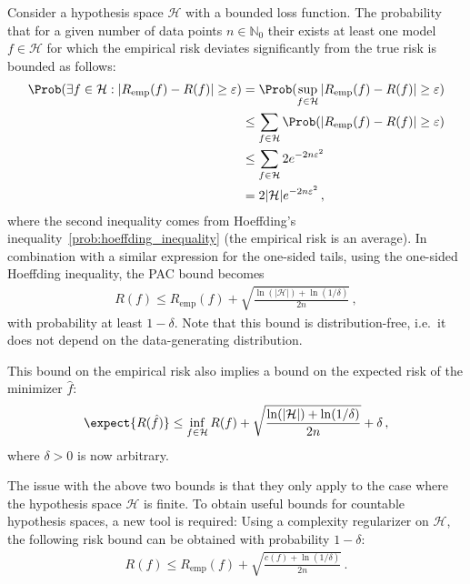     \begin{property}
        Consider a hypothesis space $\mathcal{H}$ with a bounded loss function. The probability that for a given number of data points $n\in\mathbb{N}_0$ their exists at least one model $f\in\mathcal{H}$ for which the empirical risk deviates significantly from the true risk is bounded as follows:
        \begin{align}
            \Prob(\exists f\in\mathcal{H}:|R_{\text{emp}}(f)-R(f)|\geq\varepsilon) &= \Prob(\sup_{f\in\mathcal{H}}|R_{\text{emp}}(f)-R(f)|\geq\varepsilon)\nonumber\\
            &\leq\sum_{f\in\mathcal{H}}\Prob(|R_{\text{emp}}(f)-R(f)|\geq\varepsilon)\nonumber\\
            &\leq\sum_{f\in\mathcal{H}}2e^{-2n\varepsilon^2}\nonumber\\
            &=2|\mathcal{H}|e^{-2n\varepsilon^2}\,,
        \end{align}
        where the second inequality comes from Hoeffding's inequality~\ref{prob:hoeffding_inequality} (the empirical risk is an average). In combination with a similar expression for the one-sided tails, using the one-sided Hoeffding inequality, the PAC bound becomes
        \begin{gather}
            R(f)\leq R_{\text{emp}}(f) + \sqrt{\frac{\ln(|\mathcal{H}|)+\ln(1/\delta)}{2n}}\,,
        \end{gather}
        with probability at least $1-\delta$. Note that this bound is distribution-free, i.e.~it does not depend on the data-generating distribution.

        This bound on the empirical risk also implies a bound on the expected risk of the minimizer $\hat{f}$:
        \begin{gather}
            \expect{R(\hat{f})}\leq\inf_{f\in\mathcal{H}}R(f)+\sqrt{\frac{\ln(|\mathcal{H}|)+\ln(1/\delta)}{2n}}+\delta\,,
        \end{gather}
        where $\delta>0$ is now arbitrary.
    \end{property}

    The issue with the above two bounds is that they only apply to the case where the hypothesis space $\mathcal{H}$ is finite. To obtain useful bounds for countable hypothesis spaces, a new tool is required:
    Using a complexity regularizer on $\mathcal{H}$, the following risk bound can be obtained with probability $1-\delta$:
    \begin{gather}
        R(f)\leq R_{\text{emp}}(f) + \sqrt{\frac{c(f)+\ln(1/\delta)}{2n}}\,.
    \end{gather}

